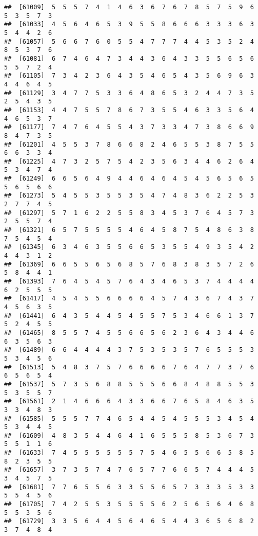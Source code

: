 \documentclass[
]{book}
\begin{document}
\begin{verbatim}
##  [61009]  5  5  5  7  4  1  4  6  3  6  7  6  7  8  5  7  5  9  6  5  3  5  7  3
##  [61033]  4  5  6  4  6  5  3  9  5  5  8  6  6  6  3  3  3  6  3  5  4  4  2  6
##  [61057]  5  6  6  7  6  0  5  5  4  7  7  7  4  4  5  3  5  2  4  8  5  3  7  6
##  [61081]  6  7  4  6  4  7  3  4  4  3  6  4  3  3  5  5  6  5  6  5  5  7  2  4
##  [61105]  7  3  4  2  3  6  4  3  5  4  6  5  4  3  5  6  9  6  3  4  4  6  4  5
##  [61129]  3  4  7  7  5  3  3  6  4  8  6  5  3  2  4  4  7  3  5  2  5  4  3  5
##  [61153]  4  4  7  5  5  7  8  6  7  3  5  5  4  6  3  3  5  6  4  4  6  5  3  7
##  [61177]  7  4  7  6  4  5  5  4  3  7  3  3  4  7  3  8  6  6  9  8  4  7  3  5
##  [61201]  4  5  5  3  7  8  6  6  8  2  4  6  5  5  3  8  7  5  5  6  6  3  3  4
##  [61225]  4  7  3  2  5  7  5  4  2  3  5  6  3  4  4  6  2  6  4  5  3  4  7  4
##  [61249]  6  6  5  6  4  9  4  4  6  4  6  4  5  4  5  6  5  6  5  5  6  5  6  6
##  [61273]  5  4  5  5  3  5  5  3  5  4  7  4  8  3  6  2  2  5  3  2  7  7  4  5
##  [61297]  5  7  1  6  2  2  5  5  8  3  4  5  3  7  6  4  5  7  3  2  5  5  7  4
##  [61321]  6  5  7  5  5  5  5  4  6  4  5  8  7  5  4  8  6  3  8  7  5  4  5  4
##  [61345]  6  3  4  6  3  5  5  6  6  5  3  5  5  4  9  3  5  4  2  4  4  3  1  2
##  [61369]  6  6  5  5  6  5  6  8  5  7  6  8  3  8  3  5  7  2  6  5  8  4  4  1
##  [61393]  7  6  4  5  4  5  7  6  4  3  4  6  5  3  7  4  4  4  4  6  2  5  5  5
##  [61417]  4  5  4  5  5  6  6  6  6  4  5  7  4  3  6  7  4  3  7  4  5  6  3  5
##  [61441]  6  4  3  5  4  4  5  4  5  5  7  5  3  4  6  6  1  3  7  5  2  4  5  5
##  [61465]  8  5  5  7  4  5  5  6  6  5  6  2  3  6  4  3  4  4  6  6  3  5  6  3
##  [61489]  6  6  4  4  4  4  3  7  5  3  5  3  5  7  6  5  5  5  3  5  3  4  5  6
##  [61513]  5  4  8  3  7  5  7  6  6  6  6  7  6  4  7  7  3  7  6  6  5  6  5  4
##  [61537]  5  7  3  5  6  8  8  5  5  5  6  6  8  4  8  8  5  5  3  5  3  5  5  7
##  [61561]  2  1  4  6  6  6  4  3  3  6  6  7  6  5  8  4  6  3  5  3  3  4  8  3
##  [61585]  5  5  5  7  7  4  6  5  4  4  5  4  5  5  5  3  4  5  4  5  3  4  4  5
##  [61609]  4  8  3  5  4  4  6  4  1  6  5  5  5  8  5  3  6  7  3  5  5  1  1  6
##  [61633]  7  4  5  5  5  5  5  5  7  5  4  6  5  5  6  6  5  8  5  8  2  3  5  5
##  [61657]  3  7  3  5  7  4  7  6  5  7  7  6  6  5  7  4  4  4  5  3  4  5  7  5
##  [61681]  7  7  6  5  5  6  3  3  5  5  6  5  7  3  3  3  5  3  3  5  5  4  5  6
##  [61705]  7  4  2  5  5  3  5  5  5  5  6  2  5  6  5  6  4  6  8  5  5  3  5  6
##  [61729]  3  3  5  6  4  4  5  6  4  6  5  4  4  3  6  5  6  8  2  3  7  4  8  4

\end{verbatim}
\end{document}
